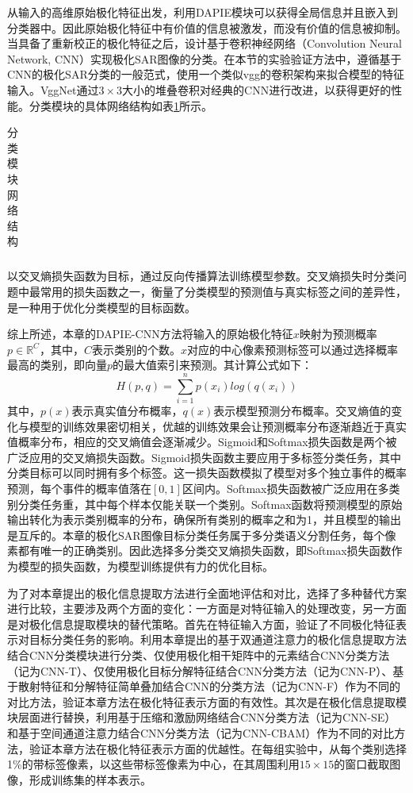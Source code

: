 从输入的高维原始极化特征出发，利用DAPIE模块可以获得全局信息并且嵌入到分类器中。因此原始极化特征中有价值的信息被激发，而没有价值的信息被抑制。当具备了重新校正的极化特征之后，设计基于卷积神经网络（Convolution Neural Network, CNN）实现极化SAR图像的分类。在本节的实验验证方法中，遵循基于CNN的极化SAR分类的一般范式，使用一个类似vgg的卷积架构来拟合模型的特征输入。VggNet通过$3 \times 3$大小的堆叠卷积对经典的CNN进行改进，以获得更好的性能。分类模块的具体网络结构如表\ref{CNN-Vgg}所示。
\begin{table}[ht]
    \caption{分类模块网络结构}
    \begin{tabular}{ccc}
    \end{tabular}
    \label{CNN-Vgg}
\end{table}

以交叉熵损失函数\citing{}为目标，通过反向传播算法训练模型参数。交叉熵损失时分类问题中最常用的损失函数之一，衡量了分类模型的预测值与真实标签之间的差异性，是一种用于优化分类模型的目标函数。

综上所述，本章的DAPIE-CNN方法将输入的原始极化特征$x$映射为预测概率$p\in \mathbb{R}^{C}$，其中，$C$表示类别的个数。$x$对应的中心像素预测标签可以通过选择概率最高的类别，即向量$p$的最大值索引来预测。其计算公式如下：
\begin{equation}
    H(p,q)=\sum_{i=1}^{n}p(x_i)log(q(x_i))
\end{equation}
其中，$p(x)$表示真实值分布概率，$q(x)$表示模型预测分布概率。交叉熵值的变化与模型的训练效果密切相关，优越的训练效果会让预测概率分布逐渐趋近于真实值概率分布，相应的交叉熵值会逐渐减少。Sigmoid和Softmax损失函数是两个被广泛应用的交叉熵损失函数。Sigmoid损失函数主要应用于多标签分类任务，其中分类目标可以同时拥有多个标签。这一损失函数模拟了模型对多个独立事件的概率预测，每个事件的概率值落在$[0,1]$区间内。Softmax损失函数被广泛应用在多类别分类任务重，其中每个样本仅能关联一个类别。Softmax函数将预测模型的原始输出转化为表示类别概率的分布，确保所有类别的概率之和为1，并且模型的输出是互斥的。本章的极化SAR图像目标分类任务属于多分类语义分割任务，每个像素都有唯一的正确类别。因此选择多分类交叉熵损失函数，即Softmax损失函数作为模型的损失函数，为模型训练提供有力的优化目标。

为了对本章提出的极化信息提取方法进行全面地评估和对比，选择了多种替代方案进行比较，主要涉及两个方面的变化：一方面是对特征输入的处理改变，另一方面是对极化信息提取模块的替代策略。首先在特征输入方面，验证了不同极化特征表示对目标分类任务的影响。利用本章提出的基于双通道注意力的极化信息提取方法结合CNN分类模块进行分类、仅使用极化相干矩阵中的元素结合CNN分类方法（记为CNN-T）、仅使用极化目标分解特征结合CNN分类方法（记为CNN-P）、基于散射特征和分解特征简单叠加结合CNN的分类方法（记为CNN-F）作为不同的对比方法，验证本章方法在极化特征表示方面的有效性。其次是在极化信息提取模块层面进行替换，利用基于压缩和激励网络结合CNN分类方法（记为CNN-SE）和基于空间通道注意力结合CNN分类方法（记为CNN-CBAM）作为不同的对比方法，验证本章方法在极化特征表示方面的优越性。在每组实验中，从每个类别选择1\%的带标签像素，以这些带标签像素为中心，在其周围利用$15 \times 15$的窗口截取图像，形成训练集的样本表示。

